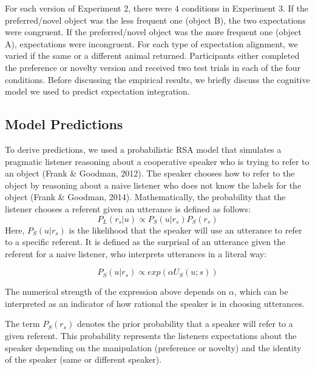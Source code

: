 \documentclass[10pt, letterpaper]{article}
\begin{document}
For each version of Experiment 2, there were 4 conditions in Experiment
3. If the preferred/novel object was the less frequent one (object B),
the two expectations were congruent. If the preferred/novel object was
the more frequent one (object A), expectations were incongruent. For
each type of expectation alignment, we varied if the same or a different
animal returned. Participants either completed the preference or novelty
version and received two test trials in each of the four conditions.
Before discussing the empirical results, we briefly discuss the
cognitive model we used to predict expectation integration.

\subsection{Model Predictions}\label{model-predictions}

To derive predictions, we used a probabilistic RSA model that simulates
a pragmatic listener reasoning about a cooperative speaker who is trying
to refer to an object (Frank \& Goodman, 2012). The speaker chooses how
to refer to the object by reasoning about a naive listener who does not
know the labels for the object (Frank \& Goodman, 2014). Mathematically,
the probability that the listener chooses a referent given an utterance
is defined as follows:\\
\[P_L(r_s|u)\propto P_S(u|r_s)P_S(r_s)\] Here, \(P_S(u|r_s)\) is the
likelihood that the speaker will use an utterance to refer to a specific
referent. It is defined as the surprisal of an utterance given the
referent for a naive listener, who interprets utterances in a literal
way:

\[P_S(u|r_s)\propto exp(\alpha U_S(u;s))\]

The numerical strength of the expression above depends on \(\alpha\),
which can be interpreted as an indicator of how rational the speaker is
in choosing utterances.

The term \(P_S(r_s)\) denotes the prior probability that a speaker will
refer to a given referent. This probability represents the listeners
expectations about the speaker depending on the manipulation (preference
or novelty) and the identity of the speaker (same or different speaker).
\end{document}

